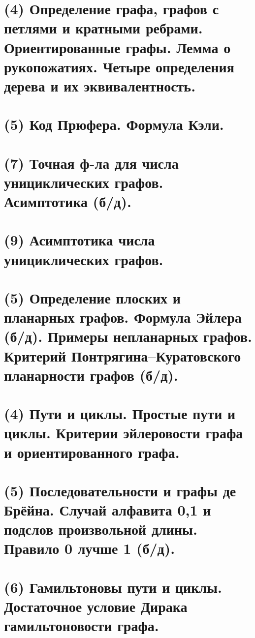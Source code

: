 \section{(4) Определение графа, графов с петлями и кратными ребрами. Ориентированные графы. Лемма
о рукопожатиях. Четыре определения дерева и их эквивалентность.}

\newpage{}

\section{(5) Код Прюфера. Формула Кэли.}

\newpage{}

\section{(7) Точная ф-ла для числа унициклических графов. Асимптотика (б/д).}

\newpage{}

\section{(9) Асимптотика числа унициклических графов.}

\newpage{}

\section{(5) Определение плоских и планарных графов. Формула Эйлера (б/д). Примеры непланарных графов. Критерий Понтрягина–Куратовского планарности графов (б/д).}

\newpage{}

\section{(4) Пути и циклы. Простые пути и циклы. Критерии эйлеровости графа и ориентированного
графа.}

\newpage{}

\section{(5) Последовательности и графы де Брёйна. Случай алфавита 0,1 и подслов произвольной длины. Правило 0 лучше 1 (б/д).}

\newpage{}

\section{(6) Гамильтоновы пути и циклы. Достаточное условие Дирака гамильтоновости графа.}

\newpage{}

